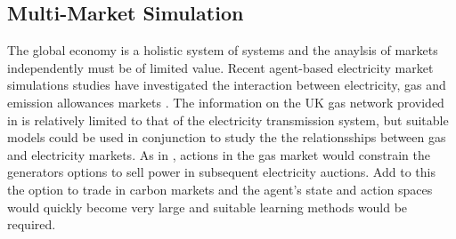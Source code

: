 \subsection{Multi-Market Simulation}
The global economy is a holistic system of
systems and the anaylsis of markets independently must be of limited value.
Recent agent-based electricity market simulations studies have investigated the
interaction between electricity, gas and emission allowances markets
\cite{krause:gas,wang:09}.
The information on the UK gas network provided in  is
relatively limited to that of the electricity transmission system, but
suitable models could be used in conjunction to study the the relationsships
between gas and electricity markets.  As in , actions in the
gas market would constrain the generators options to sell power in subsequent
electricity auctions.  Add to this the option to trade in carbon markets and
the agent's state and action spaces would quickly become very large and
suitable learning methods would be required.

%
%

